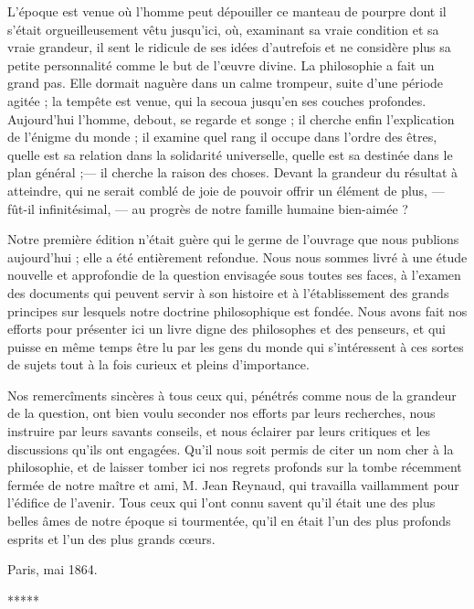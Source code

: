 \documentclass[a4paper, 11pt, oneside]{article}
\begin{document}
L'époque est venue où l'homme peut dépouiller ce manteau de pourpre dont il s'était orgueilleusement vêtu jusqu'ici, où, examinant sa vraie condition et sa vraie grandeur, il sent le ridicule de ses idées d'autrefois et ne considère plus sa petite personnalité comme le but de l'œuvre divine. La philosophie a fait un grand pas. Elle dormait naguère dans un calme trompeur, suite d'une période agitée ; la tempête est venue, qui la secoua jusqu'en ses couches profondes. Aujourd'hui l'homme, debout, se regarde et songe ; il cherche enfin l'explication de l'énigme du monde ; il examine quel rang il occupe dans l'ordre des êtres, quelle est sa relation dans la solidarité universelle, quelle est sa destinée dans le plan général ;--- il cherche la raison des choses. Devant la grandeur du résultat à atteindre, qui ne serait comblé de joie de pouvoir offrir un élément de plus, --- fût-il infinitésimal, --- au progrès de notre famille humaine bien-aimée ?

Notre première édition n'était guère qui le germe de l'ouvrage que nous publions aujourd'hui ; elle a été entièrement refondue. Nous nous sommes livré à une étude nouvelle et approfondie de la question envisagée sous toutes ses faces, à l'examen des documents qui peuvent servir à son histoire et à l'établissement des grands principes sur lesquels notre doctrine philosophique est fondée. Nous avons fait nos efforts pour présenter ici un livre digne des philosophes et des penseurs, et qui puisse en même temps être lu par les gens du monde qui s'intéressent à ces sortes de sujets tout à la fois curieux et pleins d'importance.

Nos remercîments sincères à tous ceux qui, pénétrés comme nous de la grandeur de la question, ont bien voulu seconder nos efforts par leurs recherches, nous instruire par leurs savants conseils, et nous éclairer par leurs critiques et les discussions qu'ils ont engagées. Qu'il nous soit permis de citer un nom cher à la philosophie, et de laisser tomber ici nos regrets profonds sur la tombe récemment fermée de notre maître et ami, M. Jean Reynaud, qui travailla vaillamment pour l'édifice de l'avenir. Tous ceux qui l'ont connu savent qu'il était une des plus belles âmes de notre époque si tourmentée, qu'il en était l'un des plus profonds esprits et l'un des plus grands cœurs.

\bigskip

Paris, mai 1864.

\bigskip
\centerline{*\hspace{15mm}*\hspace{15mm}*\hspace{15mm}*\hspace{15mm}*}
\bigskip
\end{document}
